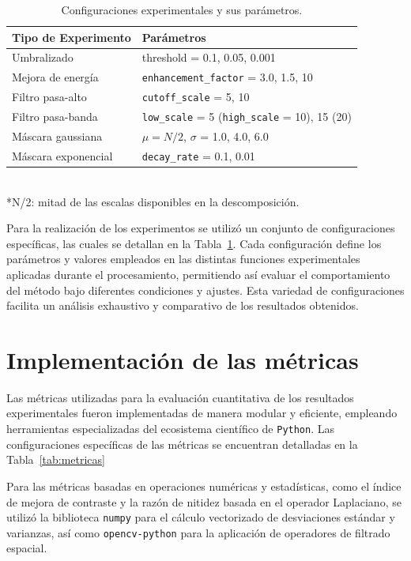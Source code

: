 \begin{table}[h]
    \centering
    \caption{Configuraciones experimentales y sus parámetros.\cite{ExperimentSource,ExperimentSource2}}
    \label{tab:experimentos}
    \begin{tabular}{>{\raggedright}p{4cm}p{6cm}}
    \toprule
    \textbf{Tipo de Experimento} & \textbf{Parámetros} \\ 
    \midrule
    Umbralizado & threshold = 0.1, 0.05, 0.001 \\
    \midrule
    Mejora de energía & \texttt{enhancement\_factor} = 3.0, 1.5, 10 \\
    \midrule
    Filtro pasa-alto & \texttt{cutoff\_scale} = 5, 10 \\
    \midrule
    Filtro pasa-banda & \texttt{low\_scale} = 5 (\texttt{high\_scale} = 10), 15 (20) \\
    \midrule
    Máscara gaussiana & $ \mu  = N/2$, $ \sigma $ = 1.0, 4.0, 6.0 \\
    \midrule
    Máscara exponencial & \texttt{decay\_rate} = 0.1, 0.01 \\
    \bottomrule
    \end{tabular}
    \footnotesize{\\*N/2: mitad de las escalas disponibles en la descomposición.}
\end{table}

Para la realización de los experimentos se utilizó un conjunto de configuraciones específicas, las cuales se detallan en la Tabla~\ref{tab:experimentos}. Cada configuración define los parámetros y valores empleados en las distintas funciones experimentales aplicadas durante el procesamiento, permitiendo así evaluar el comportamiento del método bajo diferentes condiciones y ajustes. Esta variedad de configuraciones facilita un análisis exhaustivo y comparativo de los resultados obtenidos.

\section{Implementación de las métricas} \label{section:metrics-implementation}

Las métricas utilizadas para la evaluación cuantitativa de los resultados experimentales fueron implementadas de manera modular y eficiente, empleando herramientas especializadas del ecosistema científico de \texttt{Python}. Las configuraciones específicas de las métricas se encuentran detalladas en la Tabla~\ref{tab:metricas}

Para las métricas basadas en operaciones numéricas y estadísticas, como el índice de mejora de contraste y la razón de nitidez basada en el operador Laplaciano, se utilizó la biblioteca \texttt{numpy} para el cálculo vectorizado de desviaciones estándar y varianzas, así como \texttt{opencv-python} para la aplicación de operadores de filtrado espacial.


